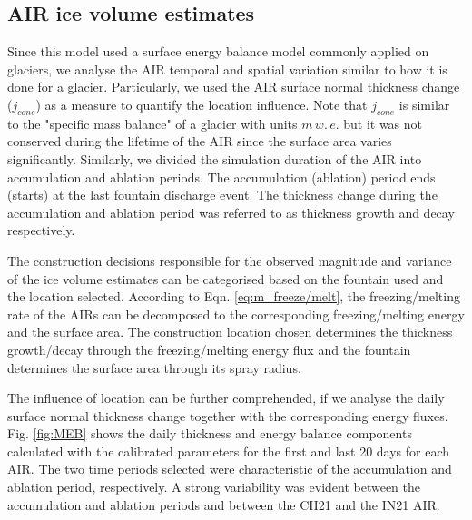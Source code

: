 \documentclass[utf8]{frontiersSCNS}
\begin{document}
\subsection{AIR ice volume estimates}

Since this model used a surface energy balance model commonly applied on glaciers, we analyse the AIR temporal
and spatial variation similar to how it is done for a glacier. Particularly, we used the AIR surface normal
thickness change ($j_{cone}$) as a measure to quantify the location influence. Note that $j_{cone}$ is similar
to the "specific mass balance" of a glacier with units $m \, w.\, e.$ but it was not conserved during the
lifetime of the AIR since the surface area varies significantly. Similarly, we divided the simulation duration
of the AIR into accumulation and ablation periods. The accumulation (ablation) period ends (starts) at the last
fountain discharge event. The thickness change during the accumulation and ablation period was referred to as
thickness growth and decay respectively.

The construction decisions responsible for the observed magnitude and variance of the ice volume estimates can
be categorised based on the fountain used and the location selected. According to Eqn.  \ref{eq:m_freeze/melt},
the freezing/melting rate of the AIRs can be decomposed to the corresponding freezing/melting energy and the
surface area. The construction location chosen determines the thickness growth/decay through the
freezing/melting energy flux and the fountain determines the surface area through its spray radius.

The influence of location can be further comprehended, if we analyse the daily surface normal thickness change
together with the corresponding energy fluxes. Fig. \ref{fig:MEB} shows the daily thickness and energy balance
components calculated with the calibrated parameters for the first and last 20 days for each AIR. The two time
periods selected were characteristic of the accumulation and ablation period, respectively. A strong variability
was evident between the accumulation and ablation periods and between the CH21 and the IN21 AIR.
\end{document}
